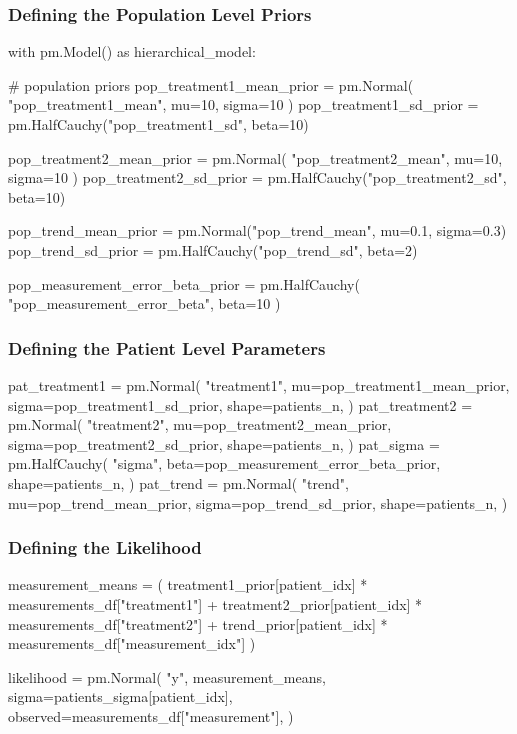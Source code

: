 \documentclass[12pt,a4paper,leqno]{report}
\theoremstyle{plain}
\theoremstyle{definition}
\theoremstyle{remark}
\begin{document}
\bigskip

\subsubsection{Defining the Population Level Priors}
\bigskip
\begin{pyverbatim}
with pm.Model() as hierarchical_model:

    # population priors
    pop_treatment1_mean_prior = pm.Normal(
        "pop_treatment1_mean", mu=10, sigma=10
    )
    pop_treatment1_sd_prior = pm.HalfCauchy("pop_treatment1_sd", beta=10)

    pop_treatment2_mean_prior = pm.Normal(
        "pop_treatment2_mean", mu=10, sigma=10
    )
    pop_treatment2_sd_prior = pm.HalfCauchy("pop_treatment2_sd", beta=10)

    pop_trend_mean_prior = pm.Normal("pop_trend_mean", mu=0.1, sigma=0.3)
    pop_trend_sd_prior = pm.HalfCauchy("pop_trend_sd", beta=2)

    pop_measurement_error_beta_prior = pm.HalfCauchy(
        "pop_measurement_error_beta", beta=10
    )
\end{pyverbatim}
\bigskip


\subsubsection{Defining the Patient Level Parameters}
\bigskip
\begin{pyverbatim}
    pat_treatment1 = pm.Normal(
        "treatment1",
        mu=pop_treatment1_mean_prior,
        sigma=pop_treatment1_sd_prior,
        shape=patients_n,
    )
    pat_treatment2 = pm.Normal(
        "treatment2",
        mu=pop_treatment2_mean_prior,
        sigma=pop_treatment2_sd_prior,
        shape=patients_n,
    )
    pat_sigma = pm.HalfCauchy(
        "sigma", beta=pop_measurement_error_beta_prior, shape=patients_n,
    )
    pat_trend = pm.Normal(
        "trend",
        mu=pop_trend_mean_prior,
        sigma=pop_trend_sd_prior,
        shape=patients_n,
    )
\end{pyverbatim}
\bigskip

\subsubsection{Defining the Likelihood}
\bigskip
\begin{pyverbatim}
    measurement_means = (
        treatment1_prior[patient_idx] * measurements_df["treatment1"]
        + treatment2_prior[patient_idx] * measurements_df["treatment2"]
        + trend_prior[patient_idx] * measurements_df["measurement_idx"]
    )

    likelihood = pm.Normal(
        "y",
        measurement_means,
        sigma=patients_sigma[patient_idx],
        observed=measurements_df["measurement"],
    )
\end{pyverbatim}
\bigskip
\end{document}
